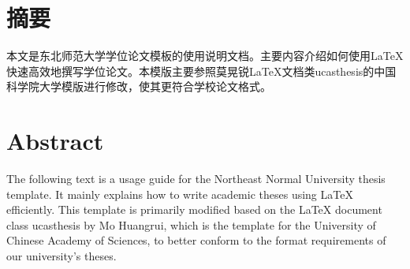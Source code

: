 \maketitle%
\MAKETITLE%
\makedeclaration%

\intotoc\chapter*{摘\qquad 要}%
\setcounter{page}{1}%

本文是东北师范大学学位论文模板的使用说明文档。主要内容介绍如何使用\LaTeX{}快速高效地撰写学位论文。本模版主要参照莫晃锐\LaTeX{}文档类ucasthesis的中国科学院大学模版进行修改，使其更符合学校论文格式。

\intotoc\chapter*{\textbf{Abstract}}%

The following text is a usage guide for the Northeast Normal University thesis template. It mainly explains how to write academic theses using \LaTeX{} efficiently. This template is primarily modified based on the LaTeX document class ucasthesis by Mo Huangrui, which is the template for the University of Chinese Academy of Sciences, to better conform to the format requirements of our university's theses.

